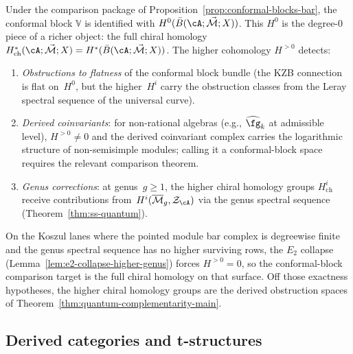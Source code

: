 \begin{remark}
\label{rem:chiral-homology-derived-conformal}
Under the comparison package of
Proposition~\ref{prop:conformal-blocks-bar}, the conformal block
\(\mathbb{V}\) is identified with
\(H^0(\bar{B}(\cA;\vec{\mathcal{M}};X))\). This \(H^0\) is the
degree-$0$ piece of a richer object: the full chiral
homology
$H^*_{\mathrm{ch}}(\cA; \vec{\mathcal{M}}; X)
= H^*(\bar{B}(\cA; \vec{\mathcal{M}}; X))$.
The higher cohomology $H^{>0}$ detects:
\begin{enumerate}
\item \emph{Obstructions to flatness} of the conformal block
 bundle (the KZB connection is flat on~$H^0$, but the
 higher~$H^i$ carry the obstruction classes from the Leray
 spectral sequence of the universal curve).
\item \emph{Derived coinvariants}: for non-rational algebras
 (e.g., $\widehat{\fg}_k$ at admissible level), $H^{>0} \neq 0$
 and the derived coinvariant complex carries the logarithmic
 structure of non-semisimple modules; calling it a conformal-block
 space requires the relevant comparison theorem.
\item \emph{Genus corrections}: at genus~$g \ge 1$, the higher
 chiral homology groups $H^i_{\mathrm{ch}}$ receive contributions
 from~$H^i(\overline{\mathcal{M}}_g, \mathcal{Z}_\cA)$ via
 the genus spectral sequence
 (Theorem~\ref{thm:ss-quantum}).
\end{enumerate}
On the Koszul lanes where the pointed module bar complex is
degreewise finite and the genus spectral sequence has no higher
surviving rows, the $E_2$ collapse
(Lemma~\ref{lem:e2-collapse-higher-genus}) forces
$H^{>0}=0$, so the conformal-block comparison target is the full
chiral homology on that surface. Off those exactness hypotheses, the
higher chiral
homology groups are the derived obstruction spaces of
Theorem~\ref{thm:quantum-complementarity-main}.
\end{remark}

\subsection{Derived categories and t-structures}
\label{sec:derived-t-structures}

